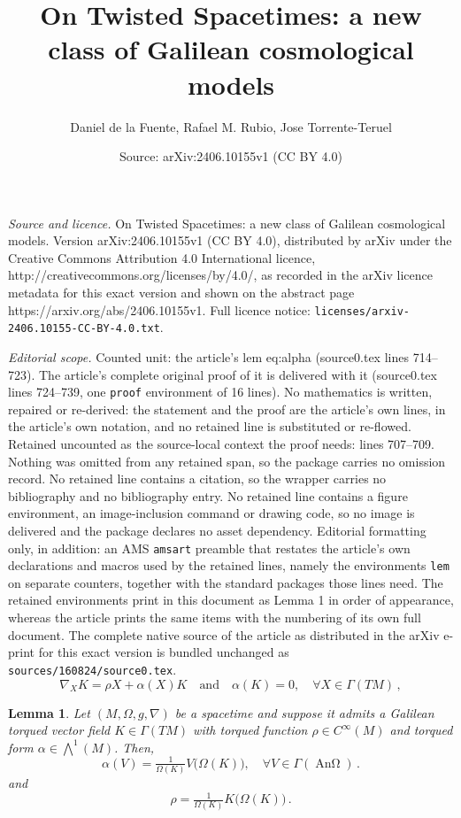 \documentclass[10pt,a4paper]{amsart}
\title{On Twisted Spacetimes: a new class of Galilean cosmological models}
\author{Daniel de la Fuente, Rafael M. Rubio, Jose Torrente-Teruel}
\date{Source: arXiv:2406.10155v1 (CC BY 4.0)}
\newtheorem{lem}{Lemma}
\DeclareMathOperator{\An}{\text{An}\Omega}
\newcommand{\quand}{\quad\text{and}\quad}
\newcommand{\spacetime}{(M,\Omega,g,\nabla)}
\begin{document}
\maketitle

\noindent\emph{Source and licence.} On Twisted Spacetimes: a new class of Galilean cosmological models. Version arXiv:2406.10155v1 (CC BY 4.0), distributed by arXiv under the Creative Commons Attribution 4.0 International licence, http://creativecommons.org/licenses/by/4.0/, as recorded in the arXiv licence metadata for this exact version and shown on the abstract page https://arxiv.org/abs/2406.10155v1. Full licence notice: \texttt{licenses/arxiv-2406.10155-CC-BY-4.0.txt}.\par\smallskip

\noindent\textit{Editorial scope.} Counted unit: the article's lem eq:alpha (source0.tex lines 714--723). The article's complete original proof of it is delivered with it (source0.tex lines 724--739, one \texttt{proof} environment of 16 lines). No mathematics is written, repaired or re-derived: the statement and the proof are the article's own lines, in the article's own notation, and no retained line is substituted or re-flowed.  Retained uncounted as the source-local context the proof needs: lines 707--709.  Nothing was omitted from any retained span, so the package carries no omission record.  No retained line contains a citation, so the wrapper carries no bibliography and no bibliography entry.  No retained line contains a figure environment, an image-inclusion command or drawing code, so no image is delivered and the package declares no asset dependency.  Editorial formatting only, in addition: an AMS \texttt{amsart} preamble that restates the article's own declarations and macros used by the retained lines, namely the environments \texttt{lem} on separate counters, together with the standard packages those lines need.  The retained environments print in this document as Lemma 1 in order of appearance, whereas the article prints the same items with the numbering of its own full document.  The complete native source of the article as distributed in the arXiv e-print for this exact version is bundled unchanged as \texttt{sources/160824/source0.tex}.
    \begin{equation}\label{eq:torqued}
        \nabla_X K = \rho X + \alpha(X) K \quand \alpha(K) = 0, \quad \forall X \in \Gamma(T M)\,,
    \end{equation}

\begin{lem}
    Let $\spacetime$ be a spacetime and suppose it admits a Galilean torqued vector field $K\in \Gamma(TM)$ with torqued function $\rho\in C^\infty(M)$ and torqued form $\alpha \in \bigwedge^1(M)$. Then, 
    \begin{equation}\label{eq:alpha}
        \alpha(V) = \tfrac{1}{\Omega(K)} V\big(\Omega(K)\big), \quad\forall V\in \Gamma(\An)\,.
    \end{equation}
 and
    \begin{equation}\label{eq:rho}
        \rho = \tfrac{1}{\Omega(K)} K\big( \Omega(K)\big)\,.
    \end{equation}
\end{lem}
\end{document}
